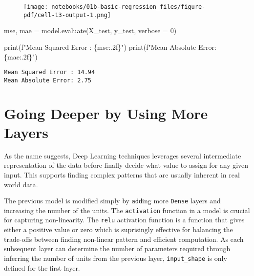 \documentclass[
  letterpaper,
  DIV=11,
  numbers=noendperiod]{scrreprt}
\newenvironment{Shaded}{\begin{snugshade}}{\end{snugshade}}
\newcommand{\BuiltInTok}[1]{\textcolor[rgb]{0.00,0.23,0.31}{#1}}
\newcommand{\DecValTok}[1]{\textcolor[rgb]{0.68,0.00,0.00}{#1}}
\newcommand{\NormalTok}[1]{\textcolor[rgb]{0.00,0.23,0.31}{#1}}
\newcommand{\OperatorTok}[1]{\textcolor[rgb]{0.37,0.37,0.37}{#1}}
\newcommand{\SpecialCharTok}[1]{\textcolor[rgb]{0.37,0.37,0.37}{#1}}
\newcommand{\SpecialStringTok}[1]{\textcolor[rgb]{0.13,0.47,0.30}{#1}}
\begin{document}
\begin{figure}[H]

{\centering \texttt{[image: notebooks/01b-basic-regression\_files/figure-pdf/cell-13-output-1.png]}

}

\end{figure}

\begin{Shaded}
\begin{Highlighting}[]
\NormalTok{mse, mae }\OperatorTok{=}\NormalTok{ model.evaluate(X\_test, y\_test, verbose }\OperatorTok{=} \DecValTok{0}\NormalTok{)}

\BuiltInTok{print}\NormalTok{(}\SpecialStringTok{f"Mean Squared Error : }\SpecialCharTok{\{}\NormalTok{mse}\SpecialCharTok{:.2f\}}\SpecialStringTok{"}\NormalTok{)}
\BuiltInTok{print}\NormalTok{(}\SpecialStringTok{f"Mean Absolute Error: }\SpecialCharTok{\{}\NormalTok{mae}\SpecialCharTok{:.2f\}}\SpecialStringTok{"}\NormalTok{)}
\end{Highlighting}
\end{Shaded}

\begin{verbatim}
Mean Squared Error : 14.94
Mean Absolute Error: 2.75
\end{verbatim}

\hypertarget{going-deeper-by-using-more-layers}{%
\section{Going Deeper by Using More
Layers}\label{going-deeper-by-using-more-layers}}

As the name suggests, Deep Learning techniques leverages several
intermediate representation of the data before finally decide what value
to assign for any given input. This supports finding complex patterns
that are usually inherent in real world data.

The previous model is modified simply by \texttt{add}ing more
\texttt{Dense} layers and increasing the number of the units. The
\texttt{activation} function in a model is crucial for capturing
non-linearity. The \texttt{relu} activation function is a function that
gives either a positive value or zero which is suprisingly effective for
balancing the trade-offs between finding non-linear pattern and
efficient computation. As each subsequent layer can determine the number
of parameters required through inferring the number of units from the
previous layer, \texttt{input\_shape} is only defined for the first
layer.
\end{document}
